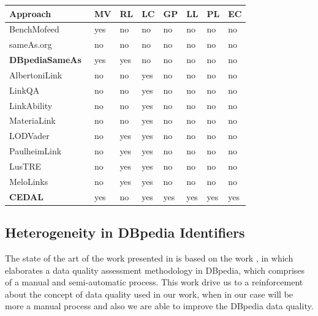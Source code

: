 \begin{table}[H]
\caption{State of the art overview regarding to Consistency on Large amount of RDF datasets, withing the following characteristics: Allow manual validation (MV), Rate the links (RL), Linkset completeness (LC), Graph partitions (GP), Larger Linksets with  more  than 19 million triples (LL), Provenance of the Links(PL), Error Classification (EC)}
\label{tab:soaConsistency}
\begin{center}
\begin{longtable}{@{}llllllll@{}}
\toprule
\textbf{Approach} & \textbf{MV} & \textbf{RL} & \textbf{LC} & \textbf{GP} & \textbf{LL} & \textbf{PL} & \textbf{EC}\\ \midrule
BenchMofeed~\cite{mofeed2015} & yes & no & no & no & no & no & no\\
sameAs.org~\cite{glaser2009managing} & no & no & no & no & no & no & no\\
\textbf{DBpediaSameAs}~\cite{valdestilhas2015dbpediasameas} & yes & yes & no & no & no & no & no\\

AlbertoniLink~\cite{Albertoni:2013:ALQ:2457317.2457327} & no & no & yes & no & no & no & no\\
LinkQA~\cite{Guret2012AssessingLD} & no & no & yes & no & no & no & no\\
LinkAbility~\cite{yaghouti2015metric} & no & no & yes & no & no & no & no\\
MateriaLink~\cite{casanova2014materialized} & no & no & yes & no & no & no & no\\
LODVader~\cite{netoassessing} & no & yes & yes & no & no & no & no\\
PaulheimLink~\cite{paulheim2014identifying} & no & yes & yes & no & no & no & no\\
LusTRE~\cite{albertoni2016linkset} & no & yes & yes & no & no & no & no\\
MeloLinks~\cite{Melo2013NotQT} & no & yes & yes & no & no & no & no\\
\textbf{CEDAL}~\cite{valdestilhas2017cedal} & yes & no & yes & yes & yes & yes & yes\\
\bottomrule
\end{longtable}
\end{center}
\end{table}

\subsection{Heterogeneity in DBpedia Identifiers}
The state of the art of the work presented in \cite{valdestilhasdbpediasameas} is based on the work \cite{anra2013}, in which elaborates a data quality assessment methodology in DBpedia, which comprises of a manual and semi-automatic process. This work drive us to a reinforcement about the concept of data quality used in our work, when in our case will be more a manual process and also we are able to improve the DBpedia data quality.

